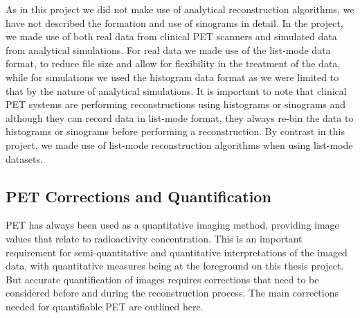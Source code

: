 As in this project we did not make use of analytical reconstruction algorithms, we have not described the formation and use of sinograms in detail. 
In the project, we made use of both real data from clinical PET scanners and simulated data from analytical simulations. For real data we made use of the list-mode data format, to reduce file size and allow for flexibility in the treatment of the data, while for simulations we used the histogram data format as we were limited to that by the nature of analytical simulations.
It is important to note that clinical PET systems are performing reconstructions using histograms or sinograms and although they can record data in list-mode format, they always re-bin the data to histograms or sinograms before performing a reconstruction. 
By contrast in this project, we made use of list-mode reconstruction algorithms when using list-mode datasets.

\subsection{PET Corrections and Quantification}
PET has always been used as a quantitative imaging method, providing image values that relate to radioactivity concentration. This is an important requirement for semi-quantitative and quantitative interpretations of the imaged data, with quantitative measures being at the foreground on this thesis project.
But accurate quantification of images requires corrections that need to be considered before and during the reconstruction process. The main corrections needed for quantifiable PET are outlined here.

